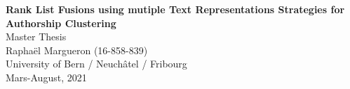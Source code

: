 \documentclass{article}
\theoremstyle{definition}
\begin{document}
\setcounter{page}{-1}

\date{Mars-August, 2021}
\author{Raphaël Margueron}

\begin{titlepage}
\vspace*{\fill}
\begin{center}
{\LARGE \textbf{Rank List Fusions using mutiple Text Representations Strategies for Authorship Clustering}}
\\[0.5cm]
{\large Master Thesis}
\\[8.0cm]
{\large Raphaël Margueron (16-858-839)}
\\[0.5cm]
{\large University of Bern / Neuchâtel / Fribourg}
\\[0.5cm]
{\large Mars-August, 2021}
\\[0.5cm]
\end{center}
\vspace*{\fill}
\end{titlepage}

\onecolumn


\twocolumn
{}






\clearpage

\onecolumn
{}
\renewcommand{\thesubsection}{\Alph{subsection}}
\renewcommand{\thetable}{\Alph{table}}
\renewcommand{\thefigure}{\Alph{figure}}
\setcounter{subsection}{0}
\setcounter{table}{0}
\setcounter{figure}{0}


\clearpage

\end{document}
